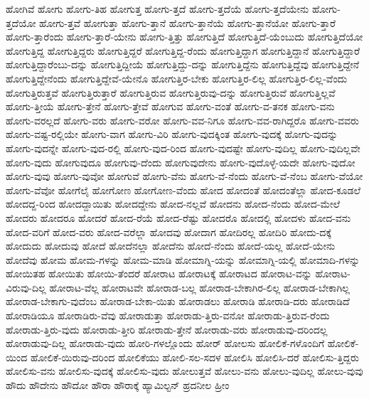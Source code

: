 {ಹೋಗಿವೆ
ಹೋಗು
ಹೋಗು-ತಿಹ
ಹೋಗುತ್ತ
ಹೋಗು-ತ್ತದೆ
ಹೋಗು-ತ್ತದೆಯೆ
ಹೋಗು-ತ್ತದೆಯೇನು
ಹೋಗು-ತ್ತದೆಯೋ
ಹೋಗು-ತ್ತವೆ
ಹೋಗುತ್ತಾ
ಹೋಗು-ತ್ತಾನೆ
ಹೋಗು-ತ್ತಾನೆಯೆ
ಹೋಗು-ತ್ತಾನೆಯೋ
ಹೋಗು-ತ್ತಾರೆ
ಹೋಗು-ತ್ತಾರೆಂದು
ಹೋಗು-ತ್ತಾರೆ-ಯೇನು
ಹೋಗು-ತ್ತಿತ್ತು
ಹೋಗುತ್ತಿದೆ
ಹೋಗುತ್ತಿದೆ-ಯೆಂಬುದು
ಹೋಗುತ್ತಿದೆಯೋ
ಹೋಗುತ್ತಿದ್ದ
ಹೋಗುತ್ತಿದ್ದರು
ಹೋಗುತ್ತಿದ್ದರೆ
ಹೋಗುತ್ತಿದ್ದ-ರೆಂದು
ಹೋಗುತ್ತಿದ್ದಾಗ
ಹೋಗುತ್ತಿದ್ದಾನೆ
ಹೋಗುತ್ತಿದ್ದಾರೆ
ಹೋಗುತ್ತಿದ್ದಾರೆಂಬು-ದನ್ನು
ಹೋಗುತ್ತಿದ್ದೀಯೆ
ಹೋಗುತ್ತಿದ್ದು-ದನ್ನು
ಹೋಗುತ್ತಿದ್ದೆನು
ಹೋಗುತ್ತಿದ್ದೆವು
ಹೋಗುತ್ತಿದ್ದೇನೆ
ಹೋಗುತ್ತಿದ್ದೇನೆಂದು
ಹೋಗುತ್ತಿದ್ದೇವೆ-ಯೇನೊ
ಹೋಗುತ್ತಿರ-ಬೇಕು
ಹೋಗುತ್ತಿರ-ಲಿಲ್ಲ
ಹೋಗುತ್ತಿರ-ಲಿಲ್ಲ-ವೆಂದು
ಹೋಗುತ್ತಿರುತ್ತವೆ
ಹೋಗುತ್ತಿರುತ್ತಾರೆ
ಹೋಗುತ್ತಿರುವ
ಹೋಗುತ್ತಿರುವು-ದನ್ನು
ಹೋಗುತ್ತಿರುವೆ
ಹೋಗುತ್ತಿಲ್ಲವೆ
ಹೋಗು-ತ್ತೀಯೆ
ಹೋಗು-ತ್ತೇನೆ
ಹೋಗು-ತ್ತೇವೆ
ಹೋಗುವ
ಹೋಗು-ವಂತೆ
ಹೋಗು-ವ-ತನಕ
ಹೋಗು-ವನು
ಹೋಗು-ವರಲ್ಲದೆ
ಹೋಗು-ವರು
ಹೋಗು-ವರೋ
ಹೋಗು-ವವ-ನಿಗೂ
ಹೋಗು-ವವ-ರಾಗಿದ್ದರೊ
ಹೋಗು-ವವರು
ಹೋಗು-ವಷ್ಟ-ರಲ್ಲಿಯೇ
ಹೋಗು-ವಾಗ
ಹೋಗು-ವಿರಿ
ಹೋಗು-ವುದಕ್ಕಿಂತ
ಹೋಗು-ವುದಕ್ಕೆ
ಹೋಗು-ವುದನ್ನು
ಹೋಗು-ವುದನ್ನೇ
ಹೋಗು-ವುದ-ರಲ್ಲಿ
ಹೋಗು-ವುದ-ರಿಂದ
ಹೋಗು-ವುದಷ್ಟೇ
ಹೋಗು-ವುದಿಲ್ಲ
ಹೋಗು-ವುದಿಲ್ಲವೇ
ಹೋಗು-ವುದು
ಹೋಗುವುದೂ
ಹೋಗುವು-ದೆಂದು
ಹೋಗುವುದೇನು
ಹೋಗು-ವುದೊಳ್ಳೆ-ಯದೇ
ಹೋಗು-ವುದೋ
ಹೋಗು-ವುವು
ಹೋಗು-ವುವೋ
ಹೋಗುವೆ
ಹೋಗು-ವೆನು
ಹೋಗು-ವೆ-ನೆಂದು
ಹೋಗು-ವೆ-ನೆಂಬ
ಹೋಗು-ವೆಯೋ
ಹೋಗು-ವೆವೋ
ಹೋಗೆಲೈ
ಹೋಗೋಣ
ಹೋಗೋಣ-ವೆಂದು
ಹೋದ
ಹೋದಂತೆ
ಹೋದಂತೆಲ್ಲಾ
ಹೋದ-ಕೂಡಲೆ
ಹೋದದ್ದ-ರಿಂದ
ಹೋದದ್ದಾಯಿತು
ಹೋದದ್ದೇನು
ಹೋದ-ನಲ್ಲವೆ
ಹೋದನು
ಹೋದ-ನೆಂದು
ಹೋದ-ಮೇಲೆ
ಹೋದರು
ಹೋದರೂ
ಹೋದರೆ
ಹೋದ-ರೆಯೆ
ಹೋದ-ರೆಷ್ಟು
ಹೋದರೊ
ಹೋದಲ್ಲಿ
ಹೋದಳು
ಹೋದ-ವನು
ಹೋದ-ವರಿಗೆ
ಹೋದ-ವರು
ಹೋದ-ವರೆಲ್ಲಾ
ಹೋದವು
ಹೋದಾಗ
ಹೋದಿರಲ್ಲ
ಹೋದಿರಿ
ಹೋದು-ದಕ್ಕೆ
ಹೋದುದು
ಹೋದುವು
ಹೋದೆ
ಹೋದೆನಲ್ಲಾ
ಹೋದೆನು
ಹೋದೆ-ನೆಂದು
ಹೋದೆ-ಯಲ್ಲ
ಹೋದೆ-ಯೇನು
ಹೋದೆವು
ಹೋಮ
ಹೋಮ-ಗಳನ್ನು
ಹೋಮ-ಮಾಡಿ
ಹೋಮಾಗ್ನಿ-ಯನ್ನು
ಹೋಮಾಗ್ನಿ-ಯಲ್ಲಿ
ಹೋಮಾದಿ-ಗಳನ್ನು
ಹೋಯಿತಹ
ಹೋಯಿತು
ಹೋಯಿ-ತೆಂದರೆ
ಹೋರಾಟ
ಹೋರಾಟಕ್ಕೆ
ಹೋರಾಟದ
ಹೋರಾಟ-ವನ್ನು
ಹೋರಾಟ-ವಿರುವು-ದಿಲ್ಲ
ಹೋರಾಟ-ವೆಲ್ಲ
ಹೋರಾಟವೇ
ಹೋರಾಡ-ಬಲ್ಲ
ಹೋರಾಡ-ಬೇಕಾಗಿರ-ಲಿಲ್ಲ
ಹೋರಾಡ-ಬೇಕಾಗಿಲ್ಲ
ಹೋರಾಡ-ಬೇಕಾಗು-ವುದೆಂಬ
ಹೋರಾಡ-ಬೇಕಾ-ಯಿತು
ಹೋರಾಡಲು
ಹೋರಾಡಿ
ಹೋರಾಡಿ-ದರು
ಹೋರಾಡಿದೆ
ಹೋರಾಡಿಯೂ
ಹೋರಾಡಿರು-ವೆವು
ಹೋರಾಡುತ್ತಾ
ಹೋರಾಡು-ತ್ತಿರು-ವನೋ
ಹೋರಾಡು-ತ್ತಿರುವ-ರೆಂದು
ಹೋರಾಡು-ತ್ತಿರು-ವುದು
ಹೋರಾಡು-ತ್ತೀರಿ
ಹೋರಾಡು-ತ್ತೇನೆ
ಹೋರಾಡು-ವರು
ಹೋರಾಡುವು-ದರಿಂದಲ್ಲ
ಹೋರಾಡುವು-ದಿಲ್ಲ
ಹೋರಾಡು-ವುದು
ಹೋರಿ-ಗಳಲ್ಲೊಂದು
ಹೋರ್
ಹೋಲಸು
ಹೋಲಿಕೆ-ಗಳೊಂದಿಗೆ
ಹೋಲಿಕೆ-ಯಿಂದ
ಹೋಲಿಕೆ-ಯಿರುವು-ದರಿಂದ
ಹೋಲಿಕೆಯು
ಹೋಲಿ-ಸಲ-ಸದಳ
ಹೋಲಿಸಿ
ಹೋಲಿಸಿ-ದರೆ
ಹೋಲಿಸು-ತ್ತಿದ್ದರು
ಹೋಲಿಸು-ವನು
ಹೋಲಿಸು-ವುದಕ್ಕೆ
ಹೋಲಿಸು-ವುದು
ಹೋಲುತ್ತವೆ
ಹೋಲು-ವನು
ಹೋಲು-ವುದಿಲ್ಲ
ಹೋಲು-ವುವು
ಹೌದು
ಹೌದೇನು
ಹೌದೋ
ಹೌರಾ
ಹೌರಾಕ್ಕೆ
ಹ್ಯಾಮಿಲ್ಟನ್
ಹ್ರದನೀಲ
ಹ್ರೀಂ
}
